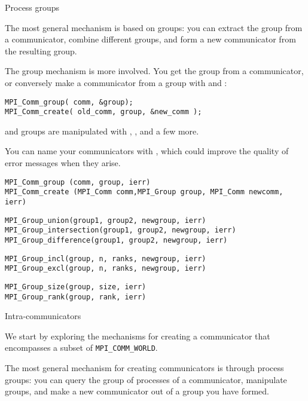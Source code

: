  {Process groups}

The most general mechanism is based on groups: you can extract the
group from a communicator, combine different groups, and form a new
communicator from the resulting group.

The group mechanism is more involved. You get the group from a
communicator, or conversely make a communicator from a group with
 and :
\begin{lstlisting}
MPI_Comm_group( comm, &group);
MPI_Comm_create( old_comm, group, &new_comm );
\end{lstlisting}
and groups are manipulated with
, ,
 and a few more.

You can name your communicators with , which
could improve the quality of error messages when they arise.

\begin{lstlisting}
MPI_Comm_group (comm, group, ierr)
MPI_Comm_create (MPI_Comm comm,MPI_Group group, MPI_Comm newcomm, ierr)
\end{lstlisting}

\begin{lstlisting}
MPI_Group_union(group1, group2, newgroup, ierr)
MPI_Group_intersection(group1, group2, newgroup, ierr)
MPI_Group_difference(group1, group2, newgroup, ierr)
\end{lstlisting}

\begin{lstlisting}
MPI_Group_incl(group, n, ranks, newgroup, ierr)
MPI_Group_excl(group, n, ranks, newgroup, ierr)
\end{lstlisting}
\begin{lstlisting}
MPI_Group_size(group, size, ierr)
MPI_Group_rank(group, rank, ierr)
\end{lstlisting}

 {Intra-communicators}
\label{sec:comm-group}

We start by exploring the mechanisms for creating a communicator that
encompasses a subset of \lstinline$MPI_COMM_WORLD$. 

The most general mechanism for creating communicators is through
process groups: you can query the group of processes of a
communicator, manipulate groups, and make a new communicator out of a
group you have formed.


